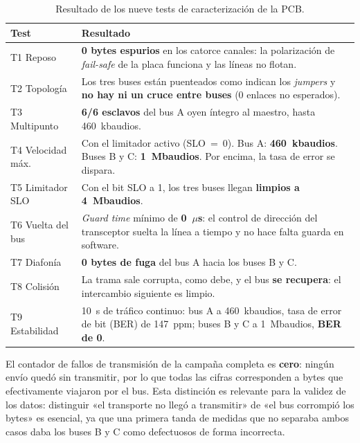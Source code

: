 \begin{table}[H]
    \centering
    \begin{tabular}{p{3.1cm} p{11.4cm}}
        \hline
        \textbf{Test} & \textbf{Resultado} \\
        \hline
        T1 Reposo & \textbf{0 bytes espurios} en los catorce canales: la polarización de \textit{fail-safe} de la placa funciona y las líneas no flotan. \\
        T2 Topología & Los tres buses están puenteados como indican los \textit{jumpers} y \textbf{no hay ni un cruce entre buses} (0 enlaces no esperados). \\
        T3 Multipunto & \textbf{6/6 esclavos} del bus A oyen íntegro al maestro, hasta 460~kbaudios. \\
        T4 Velocidad máx. & Con el limitador activo (SLO~=~0). Bus A: \textbf{460~kbaudios}. Buses B y C: \textbf{1~Mbaudios}. Por encima, la tasa de error se dispara. \\
        T5 Limitador SLO & Con el bit SLO a 1, los tres buses llegan \textbf{limpios a 4~Mbaudios}. \\
        T6 Vuelta del bus & \textit{Guard time} mínimo de \textbf{0~$\mu$s}: el control de dirección del transceptor suelta la línea a tiempo y no hace falta guarda en software. \\
        T7 Diafonía & \textbf{0 bytes de fuga} del bus A hacia los buses B y C. \\
        T8 Colisión & La trama sale corrupta, como debe, y el bus \textbf{se recupera}: el intercambio siguiente es limpio. \\
        T9 Estabilidad & 10~s de tráfico continuo: bus A a 460~kbaudios, tasa de error de bit (BER) de 147~ppm; buses B y C a 1~Mbaudios, \textbf{BER de 0}. \\
        \hline
    \end{tabular}
    \caption{Resultado de los nueve tests de caracterización de la PCB.}
    \label{tab:pcb_resumen}
\end{table}

El contador de fallos de transmisión de la campaña completa es \textbf{cero}: ningún envío quedó sin
transmitir, por lo que todas las cifras corresponden a bytes que efectivamente viajaron por el bus.
Esta distinción es relevante para la validez de los datos: distinguir «el transporte no llegó a
transmitir» de «el bus corrompió los bytes» es esencial, ya que una primera tanda de medidas que no
separaba ambos casos daba los buses B y C como defectuosos de forma incorrecta.


